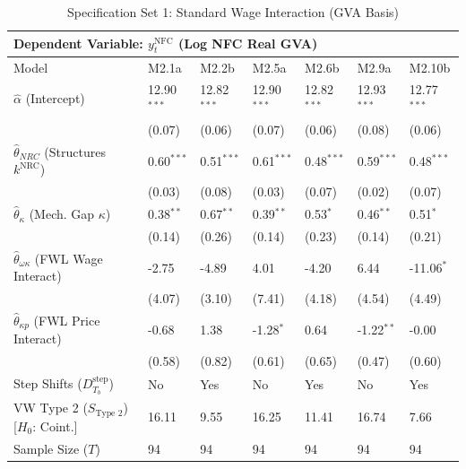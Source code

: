 \begin{table}[H]
\centering
\setlength{\tabcolsep}{2.5pt}
\caption{Specification Set 1: Standard Wage Interaction (GVA Basis)}
\label{tab:specB_set1_gva_core}
\scriptsize
\begin{tabular}{p{3.8cm}p{1.1cm}p{1.1cm}p{1.1cm}p{1.1cm}p{1.1cm}p{1.1cm}}
\toprule
\multicolumn{7}{l}{\textbf{Dependent Variable: $y_t^{\text{NFC}}$ (Log NFC Real GVA)}} \\
\midrule
Model & M2.1a & M2.2b & M2.5a & M2.6b & M2.9a & M2.10b \\
\midrule
$\hat{\alpha}$ (Intercept) & 12.90$^{***}$ & 12.82$^{***}$ & 12.90$^{***}$ & 12.82$^{***}$ & 12.93$^{***}$ & 12.77$^{***}$ \\
 & (0.07) & (0.06) & (0.07) & (0.06) & (0.08) & (0.06) \\
$\hat{\theta}_{NRC}$ (Structures $k^{\text{NRC}}$) & 0.60$^{***}$ & 0.51$^{***}$ & 0.61$^{***}$ & 0.48$^{***}$ & 0.59$^{***}$ & 0.48$^{***}$ \\
 & (0.03) & (0.08) & (0.03) & (0.07) & (0.02) & (0.07) \\
$\hat{\theta}_{\kappa}$ (Mech. Gap $\kappa$) & 0.38$^{**}$ & 0.67$^{**}$ & 0.39$^{**}$ & 0.53$^{*}$ & 0.46$^{**}$ & 0.51$^{*}$ \\
 & (0.14) & (0.26) & (0.14) & (0.23) & (0.14) & (0.21) \\
$\hat{\theta}_{\omega\kappa}$ (FWL Wage Interact) & -2.75 & -4.89 & 4.01 & -4.20 & 6.44 & -11.06$^{*}$ \\
 & (4.07) & (3.10) & (7.41) & (4.18) & (4.54) & (4.49) \\
$\hat{\theta}_{\kappa p}$ (FWL Price Interact) & -0.68 & 1.38 & -1.28$^{*}$ & 0.64 & -1.22$^{**}$ & -0.00 \\
 & (0.58) & (0.82) & (0.61) & (0.65) & (0.47) & (0.60) \\
Step Shifts ($D_{T_b}^{\text{step}}$) & No & Yes & No & Yes & No & Yes \\
\midrule
VW Type 2 ($S_{\text{Type 2}}$) [$H_0$: Coint.] & 16.11 & 9.55 & 16.25 & 11.41 & 16.74 & 7.66 \\
\midrule
Sample Size ($T$) & 94 & 94 & 94 & 94 & 94 & 94 \\
\bottomrule

\end{tabular}
\end{table}
